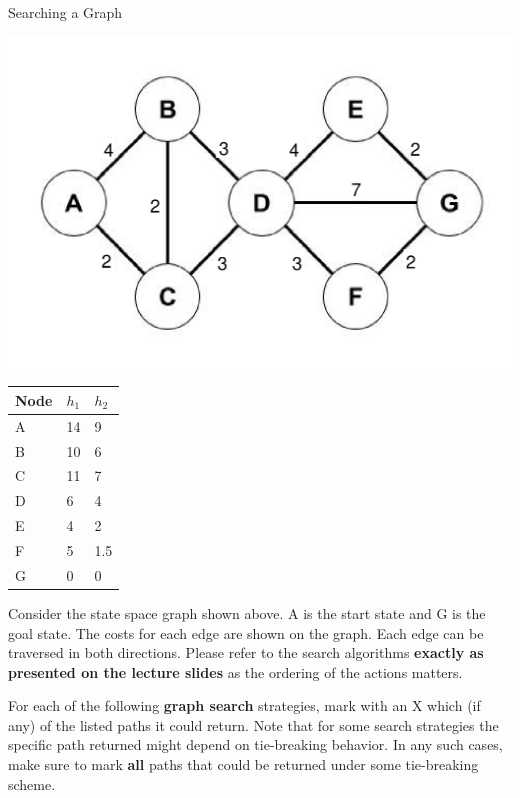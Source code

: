 \begin{problem}{Searching a Graph}

\begin{table}[h]
\centering
\begin{minipage}{0.45\linewidth}
\includegraphics[scale=.5]{figures/graph2.png} 
\end{minipage}
\hspace{0.5cm}
\begin{minipage}{0.45\linewidth}
\begin{tabular}{|l|l|l|}
\hline
Node & $h_1$ & $h_2$\\
\hline
A &14 &9\\
B &10 &6\\
C &11 &7\\
D &6 &4\\
E &4 &2\\
F &5 &1.5\\
G &0 &0\\
\hline
\end{tabular}
\end{minipage}
\end{table}

Consider the state space graph shown above. A is the start state and G is the goal state. The costs for each edge are shown on the graph. Each edge can be traversed in both directions. Please refer to the search algorithms \textbf{exactly as presented on the lecture slides} as the ordering of the actions matters.

\begin{question}[15]
For each of the following \textbf{graph search} strategies, mark with an X which (if any) of the listed paths it could return. Note that for some search strategies the specific path returned might depend on tie-breaking behavior. In any such cases, make sure to mark \textbf{all} paths that could be returned under some tie-breaking scheme.



\end{question}
\end{problem}
